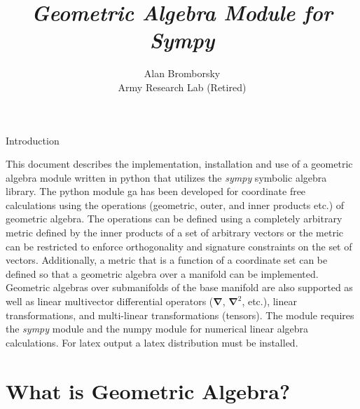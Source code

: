 \documentclass[12pt,twoside,openright]{memoir}
\title{\textbf{\textit{Geometric Algebra Module for Sympy}}}
\author{Alan Bromborsky \\ Army Research Lab (Retired)\\ \T{abrombo@verizon.net}}
\date{}
\newcommand{\bm}[1]{\boldsymbol{#1}}
\begin{document}
\maketitle
{ Introduction}\newline

   This document describes the implementation, installation and use of a
   geometric algebra module written in
   python that utilizes the \emph{sympy} symbolic algebra library.  The python
   module ga has been developed for coordinate free calculations using
   the operations (geometric, outer, and inner products etc.) of geometric algebra.
   The operations can be defined using a completely arbitrary metric defined
   by the inner products of a set of arbitrary vectors or the metric can be
   restricted to enforce orthogonality and signature constraints on the set of
   vectors.  Additionally, a metric that is a function of a coordinate set can 
   be defined so that a geometric algebra over a manifold can be implemented. 
   Geometric algebras over submanifolds of the base manifold are also supported as
   well as linear multivector differential operators ($\bm{\nabla}$, $\bm{\nabla}^2$, etc.), linear 
   transformations, and multi-linear transformations (tensors). The module requires the 
   \emph{sympy} module and the numpy module for numerical linear algebra calculations.  For latex output
   a latex distribution must be installed.\newpage

\tableofcontents

\chapter{What is Geometric Algebra?}
\end{document}
